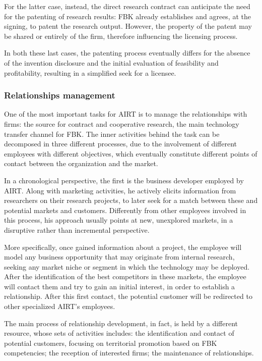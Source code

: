 For the latter case, instead, the direct research contract can anticipate the need for the patenting of research results: FBK already establishes and agrees, at the signing, to patent the research output. However, the property of the patent may be shared or entirely of the firm, therefore influencing the licensing process.

In both these last cases, the patenting process eventually differs for the absence of the invention disclosure and the initial evaluation of feasibility and profitability, resulting in a simplified seek for a licensee.

\subsubsection{Relationships management}

One of the most important tasks for AIRT is to manage the relationships with firms: the source for contract and cooperative research, the main technology transfer channel for FBK. The inner activities behind the task can be decomposed in three different processes, due to the involvement of different employees with different objectives, which eventually constitute different points of contact between the organization and the market.

In a chronological perspective, the first is the business developer employed by AIRT. Along with marketing activities, he actively elicits information from researchers on their research projects, to later seek for a match between these and potential markets and customers. Differently from other employees involved in this process, his approach usually points at new, unexplored markets, in a disruptive rather than incremental perspective. 

More specifically, once gained information about a project, the employee will model any business opportunity that may originate from internal research, seeking any market niche or segment in which the technology may be deployed. After the identification of the best competitors in these markets, the employee will contact them and try to gain an initial interest, in order to establish a relationship. After this first contact, the potential customer will be redirected to other specialized AIRT's employees. 

The main process of relationship development, in fact, is held by a different resource, whose sets of activities includes: the identification and contact of potential customers, focusing on territorial promotion based on FBK competencies; the reception of interested firms; the maintenance of relationships. 

